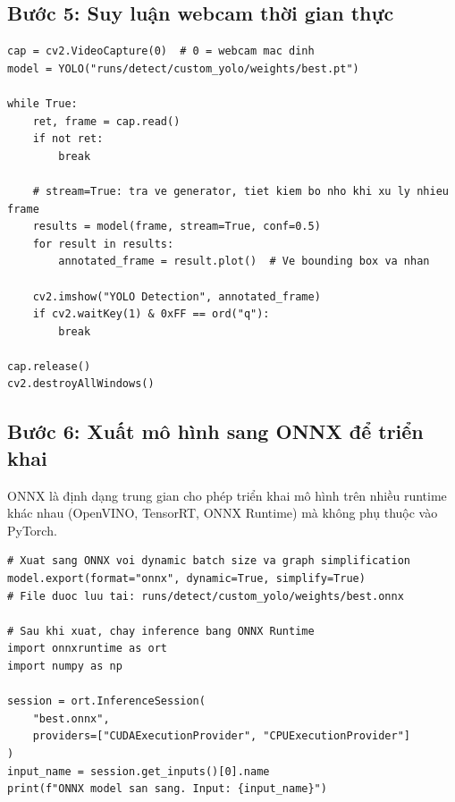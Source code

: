 \subsection{Bước 5: Suy luận webcam thời gian thực}
\label{subsec:yolo_webcam}

\begin{verbatim}
cap = cv2.VideoCapture(0)  # 0 = webcam mac dinh
model = YOLO("runs/detect/custom_yolo/weights/best.pt")

while True:
    ret, frame = cap.read()
    if not ret:
        break

    # stream=True: tra ve generator, tiet kiem bo nho khi xu ly nhieu frame
    results = model(frame, stream=True, conf=0.5)
    for result in results:
        annotated_frame = result.plot()  # Ve bounding box va nhan

    cv2.imshow("YOLO Detection", annotated_frame)
    if cv2.waitKey(1) & 0xFF == ord("q"):
        break

cap.release()
cv2.destroyAllWindows()
\end{verbatim}

\subsection{Bước 6: Xuất mô hình sang ONNX để triển khai}
\label{subsec:yolo_export}

ONNX là định dạng trung gian cho phép triển khai mô hình trên nhiều runtime khác nhau (OpenVINO, TensorRT, ONNX Runtime) mà không phụ thuộc vào PyTorch.

\begin{verbatim}
# Xuat sang ONNX voi dynamic batch size va graph simplification
model.export(format="onnx", dynamic=True, simplify=True)
# File duoc luu tai: runs/detect/custom_yolo/weights/best.onnx

# Sau khi xuat, chay inference bang ONNX Runtime
import onnxruntime as ort
import numpy as np

session = ort.InferenceSession(
    "best.onnx",
    providers=["CUDAExecutionProvider", "CPUExecutionProvider"]
)
input_name = session.get_inputs()[0].name
print(f"ONNX model san sang. Input: {input_name}")
\end{verbatim}

